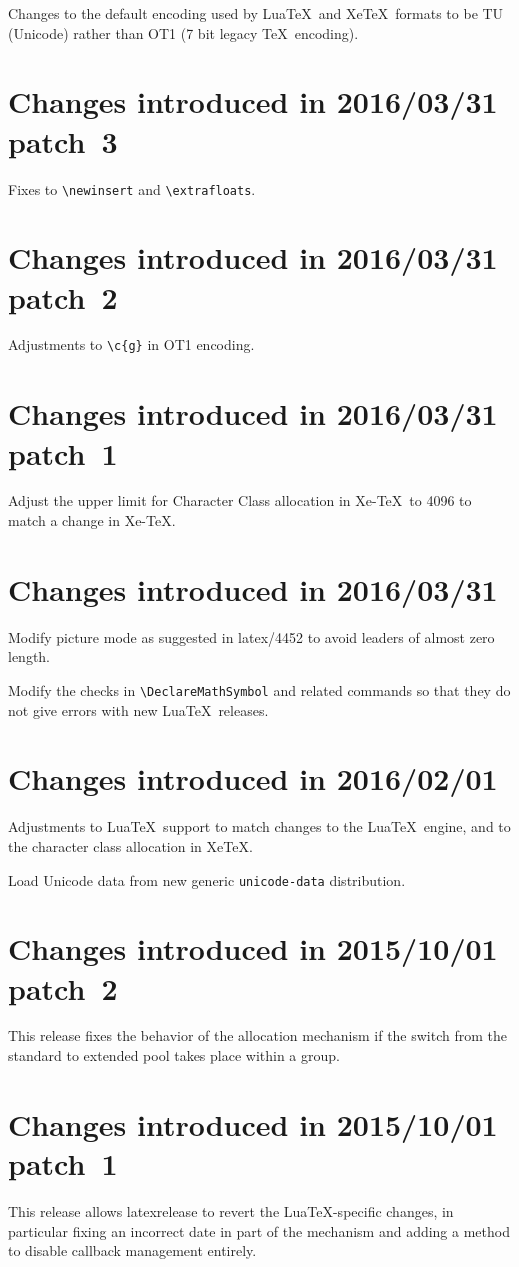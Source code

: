 \documentclass{ltxguide}
\newcommand\Lpack[1]{\mbox{\textsf{#1}}}
\begin{document}
Changes to the default encoding used by Lua\TeX\ and Xe\TeX\ formats to
be TU (Unicode) rather than OT1 (7 bit legacy \TeX\ encoding).

\section{Changes  introduced in 2016/03/31 patch~3}
Fixes to \verb|\newinsert| and \verb|\extrafloats|.

\section{Changes  introduced in 2016/03/31 patch~2}
Adjustments to \verb|\c{g}| in OT1 encoding.

\section{Changes  introduced in 2016/03/31 patch~1}
Adjust the upper limit for Character Class allocation in Xe-\TeX\ to
4096 to match a change in Xe-\TeX.

\section{Changes  introduced in 2016/03/31}
Modify picture mode as suggested in latex/4452 to avoid leaders of
almost zero length.

Modify the checks in \verb|\DeclareMathSymbol| and related commands
so that they do not give errors with new Lua\TeX\ releases.

\section{Changes  introduced in 2016/02/01}
Adjustments to Lua\TeX\ support to match changes to the Lua\TeX\ engine,
and to the character class allocation in Xe\TeX.

Load Unicode data from new generic \texttt{unicode-data} distribution.

\section{Changes  introduced in 2015/10/01 patch~2}

This release fixes the behavior of the allocation mechanism if the switch
from the standard to extended pool takes place within a group.

\section{Changes  introduced in 2015/10/01 patch~1}
This release allows \Lpack{latexrelease} to revert the
Lua\TeX{}-specific
changes, in particular fixing an incorrect date in part of the mechanism and
adding a method to disable callback management entirely.
\end{document}
